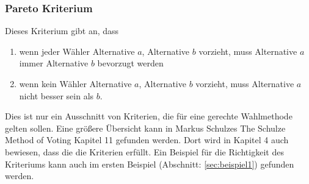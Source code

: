 \subsubsection{Pareto Kriterium} 
\label{sec:paretoKriterium}
Dieses Kriterium gibt an, dass
\begin{enumerate}
\item wenn jeder Wähler Alternative $a$, Alternative $b$ vorzieht, muss Alternative $a$ immer Alternative $b$ bevorzugt werden
\item wenn kein Wähler Alternative $a$, Alternative $b$ vorzieht, muss Alternative $a$ nicht besser sein als $b$. \citep{Schulze2017}
\end{enumerate}

Dies ist nur ein Ausschnitt von Kriterien, die für eine gerechte Wahlmethode gelten sollen. Eine größere Übersicht kann in Markus Schulzes \glqq The Schulze Method
of Voting\grqq{} \citep{Schulze2018} Kapitel 11 gefunden werden. Dort wird in Kapitel 4 auch bewiesen, dass die \schulze die Kriterien erfüllt. Ein Beispiel für die Richtigkeit des \condorcet Kriteriums kann auch im ersten Beispiel (Abschnitt: \ref{sec:beispiel1})  gefunden werden.




